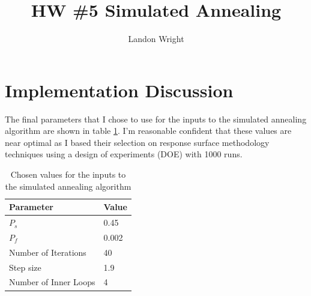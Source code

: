 \documentclass{article}
\begin{document}
\singlespacing
\title{HW \#5 Simulated Annealing}
\author{Landon Wright}
\maketitle
\section{Implementation Discussion}
The final parameters that I chose to use for the inputs to the simulated annealing algorithm are shown in table \ref{tab:values}.  I'm reasonable confident that these values are near optimal as I based their selection on response surface methodology techniques using a design of experiments (DOE) with 1000 runs.
\begin{table}
	\begin{center}
		\caption{Chosen values for the inputs to the simulated annealing algorithm}
		\label{tab:values}
\begin{tabular}{ll}
	Parameter & Value\\
	\hline
	$P_s$ & 0.45 \\
	$P_f$ & 0.002 \\
	Number of Iterations & 40 \\
	Step size & 1.9 \\
	Number of Inner Loops & 4 \\
\end{tabular}
\end{center}
\end{table}

\end{document}
